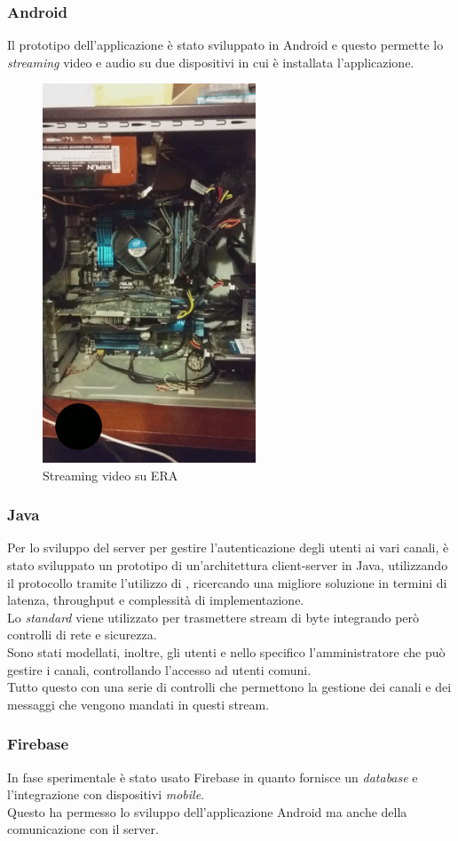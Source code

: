     \subsubsection*{Android}
      Il prototipo dell'applicazione è stato sviluppato in Android e questo permette lo \textit{streaming} video e audio su due dispositivi in cui è installata l'applicazione.
      \begin{figure}[h]
        \centering
        \includegraphics[width=180pt, height=320pt]{immagini/era.png}
        \caption{Streaming video su ERA}
        \label{era}
      \end{figure}
    \subsubsection*{Java}
      Per lo sviluppo del server per gestire l'autenticazione degli utenti ai vari canali, è stato sviluppato un prototipo di un'architettura client-server in Java, utilizzando il protocollo  tramite l'utilizzo di , ricercando una migliore soluzione in termini di latenza, throughput e complessità di implementazione.\\
      Lo \textit{standard}  viene utilizzato per trasmettere stream di byte integrando però controlli di rete e sicurezza.\\
      Sono stati modellati, inoltre, gli utenti e nello specifico l'amministratore che può gestire i canali, controllando l'accesso ad utenti comuni.\\
      Tutto questo con una serie di controlli che permettono la gestione dei canali e dei messaggi che vengono mandati in questi stream.
    \subsubsection*{Firebase}
      In fase sperimentale è stato usato Firebase in quanto fornisce un \textit{database} e l'integrazione con dispositivi \textit{mobile}.\\
      Questo ha permesso lo sviluppo dell'applicazione Android ma anche della comunicazione con il server.
      \newpage
      \null
      \thispagestyle{empty}
      \newpage
